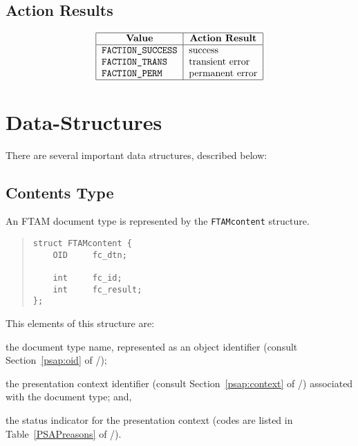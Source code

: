 \subsection	{Action Results}
\[\begin{tabular}{|l|l|}
\hline
    \multicolumn{1}{|c|}{\bf Value}&
		\multicolumn{1}{c|}{\bf Action Result}\\
\hline
    \tt FACTION\_SUCCESS&	success\\
    \tt FACTION\_TRANS&		transient error\\
    \tt FACTION\_PERM&		permanent error\\
\hline
\end{tabular}\]

\section	{Data-Structures}
There are several important data structures, described below:

\subsection	{Contents Type}
An FTAM document type is represented by the \verb"FTAMcontent" structure.
\begin{quote}\small\begin{verbatim}
struct FTAMcontent {
    OID     fc_dtn;

    int     fc_id;
    int     fc_result;
};
\end{verbatim}\end{quote}
This elements of this structure are:
\begin{describe}
\item[\verb"fc\_dtn":] the document type name,
represented as an object identifier
(consult Section~\ref{psap:oid} of \volone/);

\item[\verb"fc\_id":] the presentation context identifier
(consult Section~\ref{psap:context} of \voltwo/)
associated with the document type;
and,

\item[\verb"fc\_result":] the status indicator for the presentation context
(codes are listed in Table~\ref{PSAPreasons} of \voltwo/).
\end{describe}

